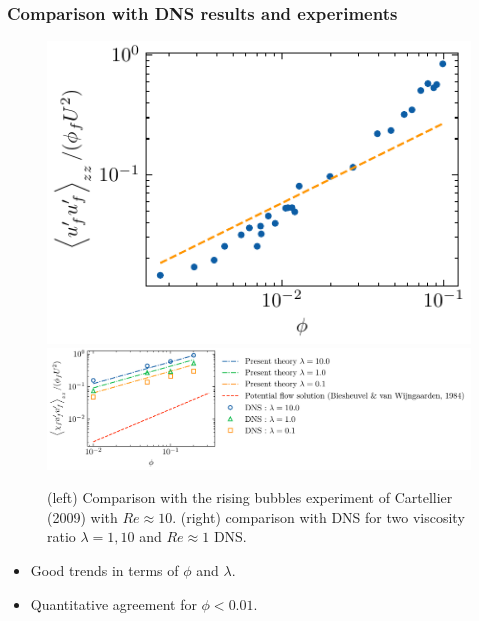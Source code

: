 \documentclass{sintefbeamer}
\begin{document}
\begin{frame}
  \frametitle{Comparison with DNS results and experiments}
  \begin{figure}[h!]
    \centering    
    \includegraphics[height = 0.20\textwidth]{image/HOMOGENEOUS_final/CA/cartellier.pdf}
    \includegraphics[height = 0.20\textwidth]{image/HOMOGENEOUS_final/CA/UUyy_Ga_5.pdf}
    \caption{
       (left) Comparison with the rising bubbles experiment of Cartellier (2009) with $Re \approx 10$. 
       (right) comparison with DNS for two viscosity ratio $\lambda =1,10$ and $Re \approx 1$ DNS. 
    }
\end{figure}  
\begin{itemize}
  \item Good trends in terms of $\phi$ and $\lambda$.  
  \item Quantitative agreement for $\phi < 0.01$.  
\end{itemize}
\end{frame}
\end{document}
